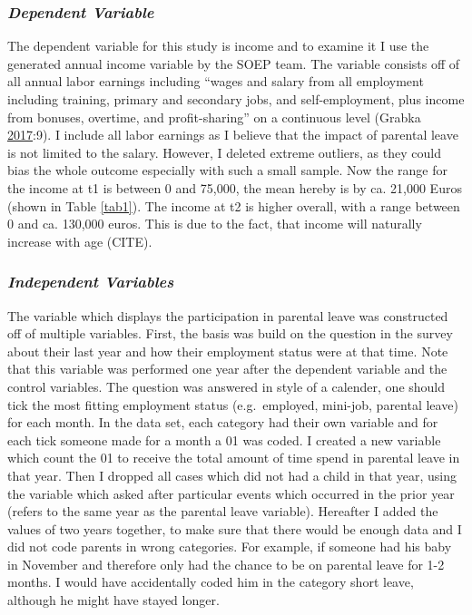 \documentclass[
  12pt,
]{article}
\begin{document}
\hypertarget{dependent-variable}{%
\subsubsection*{\texorpdfstring{\emph{Dependent Variable}}{Dependent Variable}}\label{dependent-variable}}

The dependent variable for this study is income and to examine it I use the generated annual income variable by the SOEP team. The variable consists off of all annual labor earnings including ``wages and salary from all employment including training, primary and secondary jobs, and self-employment, plus income from bonuses, overtime, and profit-sharing'' on a continuous level (Grabka \protect\hyperlink{ref-grabka_soep_2017}{2017}:9). I include all labor earnings as I believe that the impact of parental leave is not limited to the salary. However, I deleted extreme outliers, as they could bias the whole outcome especially with such a small sample. Now the range for the income at t1 is between 0 and 75,000, the mean hereby is by ca. 21,000 Euros (shown in Table \ref{tab1}). The income at t2 is higher overall, with a range between 0 and ca. 130,000 euros. This is due to the fact, that income will naturally increase with age (CITE).

\hypertarget{independent-variables}{%
\subsubsection*{\texorpdfstring{\emph{Independent Variables}}{Independent Variables}}\label{independent-variables}}

The variable which displays the participation in parental leave was constructed off of multiple variables. First, the basis was build on the question in the survey about their last year and how their employment status were at that time. Note that this variable was performed one year after the dependent variable and the control variables. The question was answered in style of a calender, one should tick the most fitting employment status (e.g.~employed, mini-job, parental leave) for each month. In the data set, each category had their own variable and for each tick someone made for a month a 01 was coded. I created a new variable which count the 01 to receive the total amount of time spend in parental leave in that year. Then I dropped all cases which did not had a child in that year, using the variable which asked after particular events which occurred in the prior year (refers to the same year as the parental leave variable). Hereafter I added the values of two years together, to make sure that there would be enough data and I did not code parents in wrong categories. For example, if someone had his baby in November and therefore only had the chance to be on parental leave for 1-2 months. I would have accidentally coded him in the category short leave, although he might have stayed longer.
\end{document}
